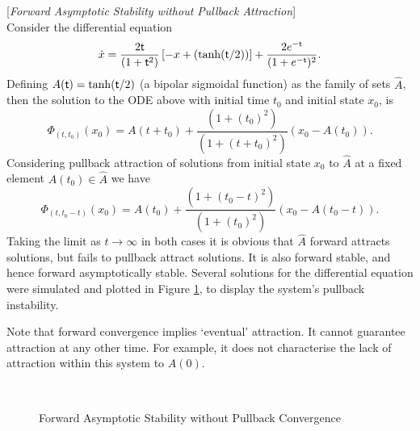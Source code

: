 \begin{eg} \label{faseg}[\textit{Forward Asymptotic Stability without
                   Pullback Attraction}] \hfill \\
  \vspace{2mm}
  Consider the differential equation
  \begin{equation}\label{de2eq}
  \dot{x} = \frac{2 \mathsf{\mathsf{t}}}{(1+ \mathsf{\mathsf{t}}^2)} \left[ -x + \left( \tanh ( \mathsf{\mathsf{t}}/2)
         \right) \right] + \frac{2 e^{- \mathsf{\mathsf{t}}}} {(1 + e^{- \mathsf{\mathsf{t}}})^2}.
  \end{equation}
  Defining $A( \mathsf{\mathsf{t}}) = \tanh ( \mathsf{\mathsf{t}}/2)$ (a bipolar sigmoidal
  function) as the family of sets  $\hat{A}$, then the solution to the ODE
  above with initial time $t_0$ and   initial state $x_0$, is
  \[ \Phi_{(t,t_0)}(x_0) = A(t + t_0) + \frac{(1 + (t_0)^2)}{(1 +
                         (t+t_0)^2)}(x_0 - A(t_0)). \]
  Considering pullback attraction of solutions from initial state $x_0$
  to $\hat{A}$ at a fixed element $A(t_0) \in \hat{A}$ we have
  \[ \Phi_{(t,t_0-t)}(x_0) = A(t_0) + \frac{(1 + (t_0-t)^2)}{(1 +
                         (t_0)^2)}(x_0 - A(t_0-t)). \]
  Taking the limit as $t \rightarrow \infty$ in both cases it is obvious
  that $\hat{A}$ forward attracts solutions, but fails to pullback attract
  solutions. It is also forward stable, and hence forward asymptotically
  stable. Several solutions for the differential equation were simulated
  and plotted in Figure \ref{fasegpic}, to display the system's
  pullback instability.

  Note that forward convergence implies `eventual' attraction. It cannot
guarantee attraction at any other time. For example, it does not characterise
 the lack of attraction within this system to $A(0)$.

  \begin{figure}[htb]
  \begin{center}
  \leavevmode
  \hbox{
  \epsfxsize=9.5cm
    }%
  \protect\caption{Forward Asymptotic Stability without Pullback
                Convergence}
         \protect\label{fasegpic}
  \end{center}
  \end{figure}
\end{eg}

